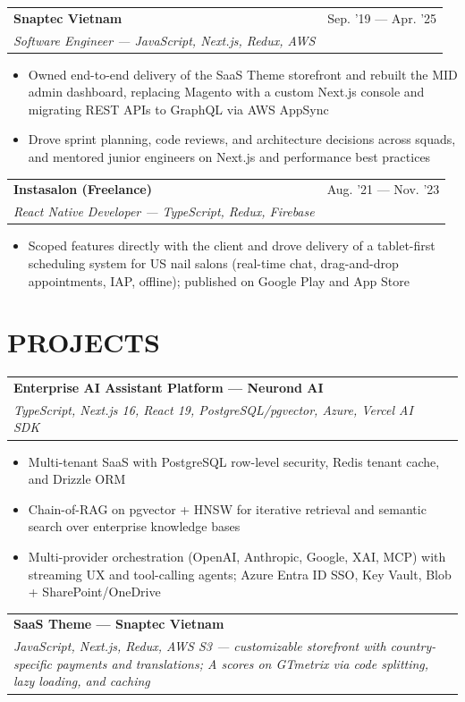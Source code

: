 \documentclass[letterpaper,10pt]{article}
\makeatletter
\newcommand{\resumeSubheading}[4]{
  \begin{tabularx}{\textwidth}{@{}X r@{}}
    \fontsize{11}{13}\selectfont\textbf{#1} & \fontsize{11}{13}\selectfont #2 \\
    \textit{#3} & \textit{#4} \\
  \end{tabularx}
  \vspace{-2pt}
}
\makeatother
\begin{document}
\vspace{3pt}

\resumeSubheading{Snaptec Vietnam}{Sep. '19 --- Apr. '25}
{Software Engineer --- JavaScript, Next.js, Redux, AWS}{}
\begin{itemize}
  \item Owned end-to-end delivery of the SaaS Theme storefront and rebuilt the MID admin dashboard, replacing Magento with a custom Next.js console and migrating REST APIs to GraphQL via AWS AppSync
  \item Drove sprint planning, code reviews, and architecture decisions across squads, and mentored junior engineers on Next.js and performance best practices
\end{itemize}

\vspace{3pt}

\resumeSubheading{Instasalon (Freelance)}{Aug. '21 --- Nov. '23}
{React Native Developer --- TypeScript, Redux, Firebase}{}
\begin{itemize}
  \item Scoped features directly with the client and drove delivery of a tablet-first scheduling system for US nail salons (real-time chat, drag-and-drop appointments, IAP, offline); published on Google Play and App Store
\end{itemize}

\section{PROJECTS}

\resumeSubheading{Enterprise AI Assistant Platform --- Neurond AI}{}
{TypeScript, Next.js 16, React 19, PostgreSQL/pgvector, Azure, Vercel AI SDK}{}
\begin{itemize}
  \item Multi-tenant SaaS with PostgreSQL row-level security, Redis tenant cache, and Drizzle ORM
  \item Chain-of-RAG on pgvector + HNSW for iterative retrieval and semantic search over enterprise knowledge bases
  \item Multi-provider orchestration (OpenAI, Anthropic, Google, XAI, MCP) with streaming UX and tool-calling agents; Azure Entra ID SSO, Key Vault, Blob + SharePoint/OneDrive
\end{itemize}

\vspace{3pt}

\resumeSubheading{SaaS Theme --- Snaptec Vietnam}{}
{JavaScript, Next.js, Redux, AWS S3 --- customizable storefront with country-specific payments and translations; A scores on GTmetrix via code splitting, lazy loading, and caching}{}
\end{document}
